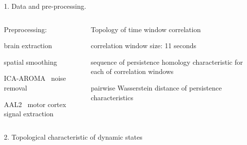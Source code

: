 \documentclass[final]{beamer}
\begin{document}
\begin{frame}{}
\begin{block}{1. Data and pre-processing.}
\begin{columns}
{{            \begin{column}{0.39\textwidth}
            Preprocessing:
                \begin{itemize}
                \small{
                    \item brain extraction
                    \item spatial smoothing
                    \item ICA-AROMA~\cite{Pruim2015} noise removal
                    \item AAL2~\cite{Rolls2015} motor cortex signal extraction
                    }
                \end{itemize}
          \end{column}
            \begin{column}{0.39\textwidth}
            Topology of time window correlation
                \begin{itemize}
                \small{
                    \item correlation window size: 11 seconds
                    \item sequence of persistence homology characteristic for each of correlation windows
                    \item pairwise Wasserstein distance of persistence characteristics
                    }
                \end{itemize}
          \end{column}
          }
          }
        \end{columns}
      \end{block}
      

      \begin{block}{2. Topological characteristic of dynamic states}
    \begin{columns}
\end{columns}
\end{block}
\end{frame}
\end{document}
